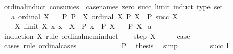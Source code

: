 \begin{isabellebody}
\isamarkupfalse%
\ ordinal{\isacharunderscore}{\kern0pt}induct\ {\isacharbrackleft}{\kern0pt}consumes\ {}{\isacharcomma}{\kern0pt}\ case{\isacharunderscore}{\kern0pt}names\ zero\ succ\ limit{\isacharcomma}{\kern0pt}\ induct\ type{\isacharcolon}{\kern0pt}\ set{\isacharbrackright}{\kern0pt}{\isacharcolon}{\kern0pt}\isanewline
\ \ \ a{\isacharcolon}{\kern0pt}\ {\isachardoublequoteopen}ordinal\ X{\isachardoublequoteclose}\isanewline
\ \ \ P{\isacharcolon}{\kern0pt}\ {\isachardoublequoteopen}P\ {}{\isachardoublequoteclose}\ {\isachardoublequoteopen}{\isasymAnd}X{\isachardot}{\kern0pt}\ {\isasymlbrakk}ordinal\ X{\isacharsemicolon}{\kern0pt}\ P\ X{\isasymrbrakk}\ {\isasymLongrightarrow}\ P\ {\isacharparenleft}{\kern0pt}succ\ X{\isacharparenright}{\kern0pt}{\isachardoublequoteclose}\isanewline
\ \ \ \ {\isachardoublequoteopen}{\isasymAnd}X{\isachardot}{\kern0pt}\ {\isasymlbrakk}limit\ X{\isacharsemicolon}{\kern0pt}\ {\isasymAnd}x{\isachardot}{\kern0pt}\ x\ {\isasymin}\ X\ {\isasymLongrightarrow}\ P\ x{\isasymrbrakk}\ {\isasymLongrightarrow}\ P\ {\isacharparenleft}{\kern0pt}{\isasymUnion}X{\isacharparenright}{\kern0pt}{\isachardoublequoteclose}\isanewline
\ \ \ {\isachardoublequoteopen}P\ X{\isachardoublequoteclose}\isanewline
%
\isadelimproof
%
\endisadelimproof
%
\isatagproof
{}\isamarkupfalse%
\ a\isanewline
{}\isamarkupfalse%
\ {\isacharparenleft}{\kern0pt}induction\ X\ rule{\isacharcolon}{\kern0pt}\ ordinal{\isacharunderscore}{\kern0pt}mem{\isacharunderscore}{\kern0pt}induct{\isacharparenright}{\kern0pt}\isanewline
\ \ \isamarkupfalse%
\ {\isacharparenleft}{\kern0pt}step\ X{\isacharparenright}{\kern0pt}\isanewline
\ \ \isamarkupfalse%
\ \isamarkupfalse%
\ {\isacharquery}{\kern0pt}case\isanewline
\ \ \isamarkupfalse%
\ {\isacharparenleft}{\kern0pt}cases\ rule{\isacharcolon}{\kern0pt}\ ordinal{\isacharunderscore}{\kern0pt}cases{\isacharparenright}{\kern0pt}\isanewline
\ \ \ \ \isamarkupfalse%
\ {}\isanewline
\ \ \ \ \isamarkupfalse%
\ P{\isacharparenleft}{\kern0pt}{}{\isacharparenright}{\kern0pt}\ \isamarkupfalse%
\ {\isacharquery}{\kern0pt}thesis\ \isamarkupfalse%
\ simp\isanewline
\ \ \isamarkupfalse%
\isanewline
\ \ \ \ \isamarkupfalse%
\ {\isacharparenleft}{\kern0pt}succ\ l{\isacharparenright}{\kern0pt}\isanewline
\ \ \ \ \isamarkupfalse%

\end{isabellebody}
